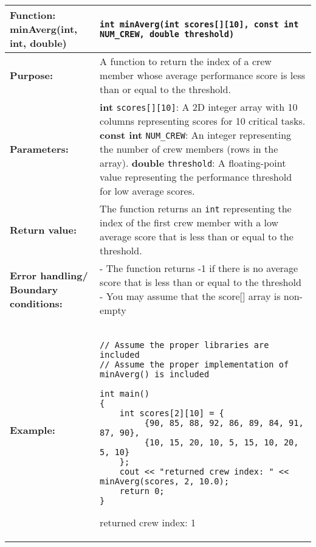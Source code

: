 \newpage
\begin{longtable}[H]{|p{1.7in}|p{4.0in}|} \hline
        \textbf{Function:} \newline 
        minAverg(int, int, double) & \texttt{int minAverg(int scores[][10], const int NUM_CREW, double threshold)}
        \\ \hline
        \textbf{Purpose:}  & A function to return the index of a crew member whose average performance score is less than or equal to the threshold.\\ \hline
        \textbf{Parameters:} &  
        \textbf{int} \texttt{scores[][10]}: A 2D integer array with 10 columns representing scores for 10 critical tasks. \newline
        \textbf{const int} \texttt{NUM\_CREW}: An integer representing the number of crew members (rows in the array). \newline
        \textbf{double} \texttt{threshold}: A floating-point value representing the performance threshold for low average scores.
 
\\ \hline
        \textbf{Return value:} &  The function returns an \texttt{int} representing the index of the first crew member with a low average score that is less than or equal to the threshold. \\ \hline
        \textbf{Error handling/
Boundary conditions:} &  
- The function returns -1 if there is no average score that is less than or equal to the threshold \newline 
- You may assume that the score[] array is non-empty
\\ \hline
        \textbf{Example:} & 
        \begin{example}
        \begin{verbatim}

// Assume the proper libraries are included
// Assume the proper implementation of minAverg() is included

int main()
{
    int scores[2][10] = {
         {90, 85, 88, 92, 86, 89, 84, 91, 87, 90},  
         {10, 15, 20, 10, 5, 15, 10, 20, 5, 10}          
    };
    cout << "returned crew index: " <<  minAverg(scores, 2, 10.0);
    return 0;
}
        \end{verbatim}
        \end{example}

        \begin{sample}
returned crew index: 1
        \end{sample}
             \\ \hline
\end{longtable}

